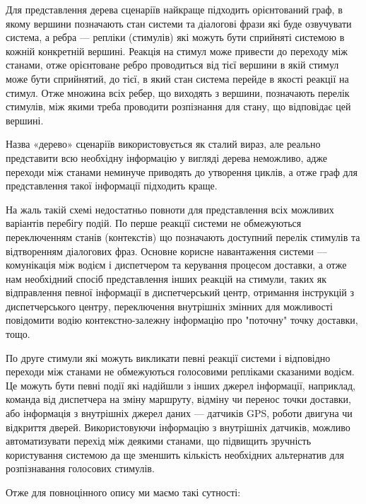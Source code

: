 Для представлення дерева сценаріїв найкраще підходить орієнтований граф, в якому вершини позначають стан системи та діалогові фрази які буде озвучувати система, а ребра --- репліки (стимулів) які можуть бути сприйняті системою в кожній конкретній вершині. Реакція на стимул може привести до переходу між станами, отже орієнтоване ребро проводиться від тієї вершини в якій стимул може бути сприйнятий, до тієї, в який стан система перейде в якості реакції на стимул. Отже множина всіх ребер, що виходять з вершини, позначають перелік стимулів, між якими треба проводити розпізнання для стану, що відповідає цей вершині.

Назва «дерево» сценаріїв використовується як сталий вираз, але реально представити всю необхідну інформацію у вигляді дерева неможливо, адже переходи між станами неминуче приводять до утворення циклів, а отже граф для представлення такої інформації підходить краще.

На жаль такій схемі недостатньо повноти для представлення всіх можливих варіантів перебігу подій. По перше реакції системи не обмежуються переключенням станів (контекстів) що позначають доступний перелік стимулів та відтворенням діалогових фраз. Основне корисне навантаження системи --- комунікація між водієм і диспетчером та керування процесом доставки, а отже нам необхідний спосіб представлення інших реакцій на стимули, таких як відправлення певної інформації в диспетчерський центр, отримання інструкцій з диспетчерського центру, переключення внутрішніх змінних для можливості повідомити водію контекстно-залежну інформацію про "поточну" точку доставки, тощо.

По друге стимули які можуть викликати певні реакції системи і відповідно переходи між станами не обмежуються голосовими репліками сказаними водієм. Це можуть бути певні події які надійшли з інших джерел інформації, наприклад, команда від диспетчера на зміну маршруту, відміну чи перенос точки доставки, або інформація з внутрішніх джерел даних --- датчиків GPS, роботи двигуна чи відкриття дверей. Використовуючи інформацію з внутрішніх датчиків, можливо автоматизувати перехід між деякими станами, що підвищить зручність користування системою да ще зменшить кількість необхідних альтернатив для розпізнавання голосових стимулів. 

Отже для повноцінного опису ми маємо такі сутності:

